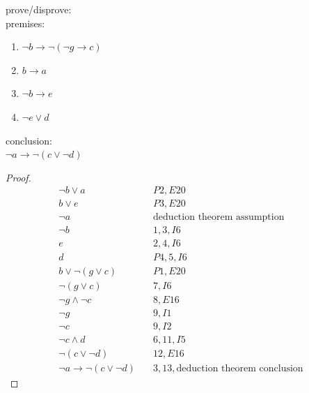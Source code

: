 \documentclass[a4paper,12pt]{article}
\begin{document}
\begin{question}
prove/disprove:\\[0pt]
premises:\\[0pt]
\begin{enumerate}
\item \(\lnot b \to \lnot (\lnot g \to c)\)\\[0pt]
\item \(b \to a\)\\[0pt]
\item \(\lnot b \to e\)\\[0pt]
\item \(\lnot e \lor d\)\\[0pt]
\end{enumerate}
conclusion:\\[0pt]
\(\lnot a \to \lnot (c \lor \lnot d)\)\\[0pt]
\begin{proof}
\begin{align}
  \lnot b \lor a &\quad P2,E20\\
  b \lor e &\quad P3,E20\\
  \lnot a &\quad \text{deduction theorem assumption}\\
  \lnot b &\quad 1,3,I6\\
  e &\quad 2,4,I6\\
  d &\quad P4,5,I6\\
  b \lor \lnot (g \lor c) &\quad P1,E20\\
  \lnot (g \lor c) &\quad 7,I6\\
  \lnot g \land \lnot c &\quad 8,E16\\
  \lnot g &\quad 9,I1\\
  \lnot c &\quad 9,I2\\
  \lnot c \land d &\quad 6,11,I5\\
  \lnot (c \lor \lnot d) &\quad 12,E16\\
  \lnot a \to \lnot (c \lor \lnot d) &\quad 3,13,\text{deduction theorem conclusion}
\end{align}
\end{proof}
\end{question}
\end{document}
